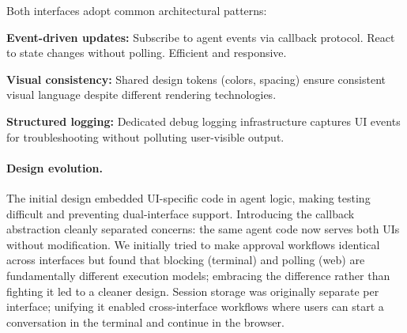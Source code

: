 Both interfaces adopt common architectural patterns:

\begin{packeditemize}
\item \textbf{Event-driven updates:} Subscribe to agent events via callback protocol. React to state changes without polling. Efficient and responsive.
\item \textbf{Visual consistency:} Shared design tokens (colors, spacing) ensure consistent visual language despite different rendering technologies.
\item \textbf{Structured logging:} Dedicated debug logging infrastructure captures UI events for troubleshooting without polluting user-visible output.
\end{packeditemize}

\paragraph{Design evolution.} The initial design embedded UI-specific code in agent logic, making testing difficult and preventing dual-interface support. Introducing the callback abstraction cleanly separated concerns: the same agent code now serves both UIs without modification. We initially tried to make approval workflows identical across interfaces but found that blocking (terminal) and polling (web) are fundamentally different execution models; embracing the difference rather than fighting it led to a cleaner design. Session storage was originally separate per interface; unifying it enabled cross-interface workflows where users can start a conversation in the terminal and continue in the browser.
